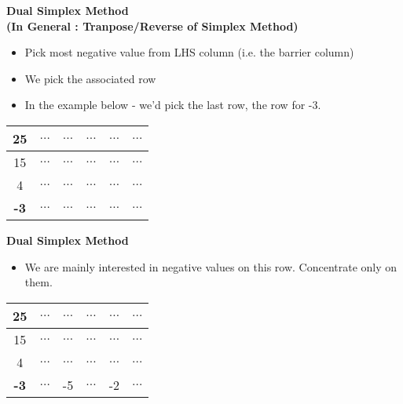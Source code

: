\documentclass{beamer}
\begin{document}
\begin{frame}
\noindent \textbf{Dual Simplex Method}	\\
\noindent \textbf{(In General  : Tranpose/Reverse of Simplex Method)}
\begin{itemize}
	\item Pick most negative value from LHS column (i.e. the barrier column)
	\item We pick the associated row
	\item In the example below - we'd pick the last row, the row for -3.
\end{itemize}
{
	\large
\begin{center}
\begin{tabular}{|c||c|c|c|c|c|}
	\hline 25 & $\ldots$ & $\ldots$ & $\ldots$ & $\ldots$ & $\ldots$ \\  
\hline	\hline 15 & $\ldots$ & $\ldots$ & $\ldots$ & $\ldots$ & $\ldots$ \\ 
	\hline 4 & $\ldots$ & $\ldots$ & $\ldots$ & $\ldots$ & $\ldots$ \\  
	\hline \textbf{-3} & $\ldots$ & $\ldots$ & $\ldots$ & $\ldots$ & $\ldots$ \\ 
	\hline 
\end{tabular} 	
\end{center}
}
\end{frame}
\begin{frame}
\noindent \textbf{Dual Simplex Method}	\\
	\begin{itemize}
		\item We are mainly interested in negative values on this row. Concentrate only on them.
	\end{itemize}
{
	\large
	\begin{center}
		\begin{tabular}{|c||c|c|c|c|c|}
			\hline 25 & $\ldots$ & $\ldots$ & $\ldots$ & $\ldots$ & $\ldots$ \\  \hline
			\hline 15 & $\ldots$ & $\ldots$ & $\ldots$ & $\ldots$ & $\ldots$ \\ 
			\hline 4 & $\ldots$ & $\ldots$ & $\ldots$ & $\ldots$ & $\ldots$ \\  
			\hline \textbf{-3} & $\ldots$ & -5 & $\ldots$ & -2 & $\ldots$ \\ 
			\hline 
		\end{tabular} 	
	\end{center}
}
\end{frame}
\end{document}
